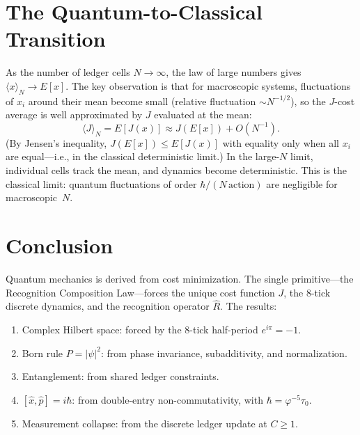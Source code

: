 \documentclass[12pt,a4paper]{article}
\theoremstyle{definition}
\theoremstyle{remark}
\begin{document}
\section{The Quantum-to-Classical Transition}
\label{sec:classical}

As the number of ledger cells $N \to \infty$, the law of large numbers
gives $\langle x \rangle_N \to E[x]$.  The key observation is that for
macroscopic systems, fluctuations of $x_i$ around their mean become small
(relative fluctuation $\sim N^{-1/2}$), so the $J$-cost average is well
approximated by $J$ evaluated at the mean:
\begin{equation}
  \langle J \rangle_N = E[J(x)] \approx J(E[x]) + O(N^{-1}).
\end{equation}
(By Jensen's inequality, $J(E[x]) \leq E[J(x)]$ with equality only
when all $x_i$ are equal---i.e., in the classical deterministic limit.)
In the large-$N$ limit, individual cells track the mean, and dynamics
become deterministic.  This is the classical limit: quantum fluctuations
of order $\hbar/(N\,\text{action})$ are negligible for macroscopic~$N$.

\section{Conclusion}
\label{sec:conclusion}

Quantum mechanics is derived from cost minimization.  The single
primitive---the Recognition Composition Law---forces the unique cost
function $J$, the 8-tick discrete dynamics, and the recognition
operator $\widehat{R}$.  The results:
\begin{enumerate}
  \item Complex Hilbert space: forced by the 8-tick half-period
  $e^{i\pi} = -1$.
  \item Born rule $P = |\psi|^2$: from phase invariance,
  subadditivity, and normalization.
  \item Entanglement: from shared ledger constraints.
  \item $[\hat{x}, \hat{p}] = i\hbar$: from double-entry
  non-commutativity, with $\hbar = \varphi^{-5}\tau_0$.
  \item Measurement collapse: from the discrete ledger update at
  $C \geq 1$.
\end{enumerate}
\end{document}
